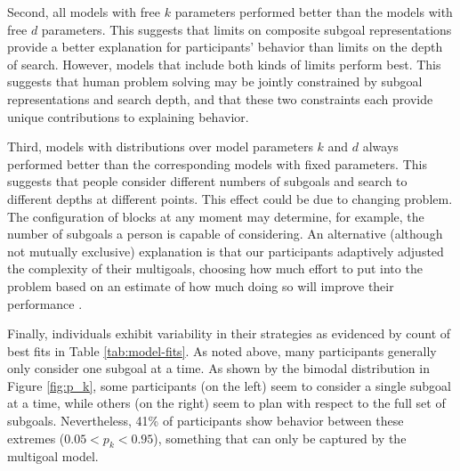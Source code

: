 \documentclass[10pt,letterpaper]{article}
\begin{document}
Second, all models with free $k$ parameters performed better than the models with free $d$ parameters. This suggests that limits on composite subgoal representations provide a better explanation for participants' behavior than limits on the depth of search. However, models that include both kinds of limits perform best. This suggests that human problem solving may be jointly constrained by subgoal representations and search depth, and that these two constraints each provide unique contributions to explaining behavior.

Third, models with distributions over model parameters $k$ and $d$ always performed better than the corresponding models with fixed parameters. This suggests that people consider different numbers of subgoals and search to different depths at different points. This effect could be due to changing problem. The configuration of blocks at any moment may determine, for example, the number of subgoals a person is capable of considering. An alternative (although not mutually exclusive) explanation is that our participants adaptively adjusted the complexity of their multigoals, choosing how much effort to put into the problem based on an estimate of how much doing so will improve their performance \citep{Shenhav2017,lieder2017strategy}.

Finally, individuals exhibit variability in their strategies as evidenced by count of best fits in Table \ref{tab:model-fits}. As noted above, many participants generally only consider one subgoal at a time. As shown by the bimodal distribution in Figure \ref{fig:p_k}, some participants (on the left) seem to consider a single subgoal at a time, while others (on the right) seem to plan with respect to the full set of subgoals. Nevertheless, 41\% of participants show behavior between these extremes ($0.05 < p_k < 0.95$), something that can only be captured by the multigoal model.




\end{document}
